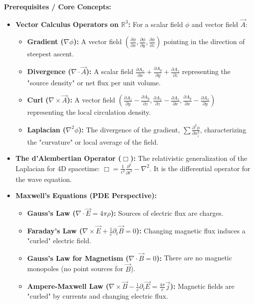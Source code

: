 \begin{solution}
\textbf{Prerequisites / Core Concepts:}
\begin{itemize}
    \item \textbf{Vector Calculus Operators on $\mathbb{R}^3$:} For a scalar field $\phi$ and vector field $\vec{A}$:
    \begin{itemize}
        \item \textbf{Gradient ($\nabla \phi$):} A vector field $\left( \frac{\partial \phi}{\partial x}, \frac{\partial \phi}{\partial y}, \frac{\partial \phi}{\partial z} \right)$ pointing in the direction of steepest ascent.
        \item \textbf{Divergence ($\nabla \cdot \vec{A}$):} A scalar field $\frac{\partial A_x}{\partial x} + \frac{\partial A_y}{\partial y} + \frac{\partial A_z}{\partial z}$ representing the "source density" or net flux per unit volume.
        \item \textbf{Curl ($\nabla \times \vec{A}$):} A vector field $\left( \frac{\partial A_z}{\partial y} - \frac{\partial A_y}{\partial z}, \frac{\partial A_x}{\partial z} - \frac{\partial A_z}{\partial x}, \frac{\partial A_y}{\partial x} - \frac{\partial A_x}{\partial y} \right)$ representing the local circulation density.
        \item \textbf{Laplacian ($\nabla^2 \phi$):} The divergence of the gradient, $\sum \frac{\partial^2 \phi}{\partial x_i^2}$, characterizing the "curvature" or local average of the field.
    \end{itemize}
    \item \textbf{The d'Alembertian Operator ($\Box$):} The relativistic generalization of the Laplacian for 4D spacetime: $\Box = \frac{1}{c^2} \frac{\partial^2}{\partial t^2} - \nabla^2$. It is the differential operator for the wave equation.
    \item \textbf{Maxwell's Equations (PDE Perspective):}
    \begin{itemize}
        \item \textbf{Gauss's Law ($\nabla \cdot \vec{E} = 4\pi\rho$):} Sources of electric flux are charges.
        \item \textbf{Faraday's Law ($\nabla \times \vec{E} + \frac{1}{c}\partial_t \vec{B} = 0$):} Changing magnetic flux induces a "curled" electric field.
        \item \textbf{Gauss's Law for Magnetism ($\nabla \cdot \vec{B} = 0$):} There are no magnetic monopoles (no point sources for $\vec{B}$).
        \item \textbf{Ampere-Maxwell Law ($\nabla \times \vec{B} - \frac{1}{c}\partial_t \vec{E} = \frac{4\pi}{c}\vec{j}$):} Magnetic fields are "curled" by currents and changing electric flux.

\end{itemize}
\end{itemize}
\end{solution}
